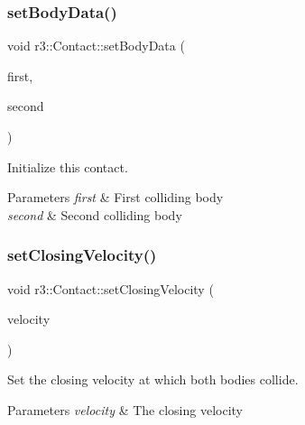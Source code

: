 \mbox{\label{classr3_1_1_contact_a7471ab195f0cadaee4e2f27f15bb9fff}} 
\subsubsection{\texorpdfstring{set\+Body\+Data()}{setBodyData()}}
{\footnotesize\ttfamily void r3\+::\+Contact\+::set\+Body\+Data (\begin{DoxyParamCaption}\item[{\mbox{\hyperlink{classr3_1_1_rigid_body}{Rigid\+Body}} $\ast$}]{first,  }\item[{\mbox{\hyperlink{classr3_1_1_rigid_body}{Rigid\+Body}} $\ast$}]{second }\end{DoxyParamCaption})}



Initialize this contact. 


\begin{DoxyParams}{Parameters}
{\em first} & First colliding body \\
\hline
{\em second} & Second colliding body \\
\hline
\end{DoxyParams}
\mbox{\label{classr3_1_1_contact_a7b837cd82d64d93ce1a98cdd172dd868}} 
\subsubsection{\texorpdfstring{set\+Closing\+Velocity()}{setClosingVelocity()}}
{\footnotesize\ttfamily void r3\+::\+Contact\+::set\+Closing\+Velocity (\begin{DoxyParamCaption}\item[{const glm\+::vec3 \&}]{velocity }\end{DoxyParamCaption})}



Set the closing velocity at which both bodies collide. 


\begin{DoxyParams}{Parameters}
{\em velocity} & The closing velocity \\
\hline
\end{DoxyParams}
\mbox{\label{classr3_1_1_contact_af7866e211b169ce6565d3f37af8ef8d7}} 
